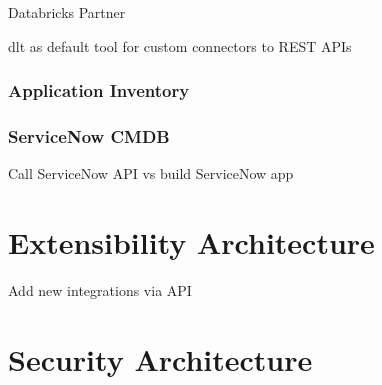 Databricks Partner

dlt as default tool for custom connectors to REST APIs

\subsubsection{Application Inventory}

\subsubsection{ServiceNow CMDB}

Call ServiceNow API vs build ServiceNow app



\subsubsection{}

\section{Extensibility Architecture}

Add new integrations via API

\section{Security Architecture}